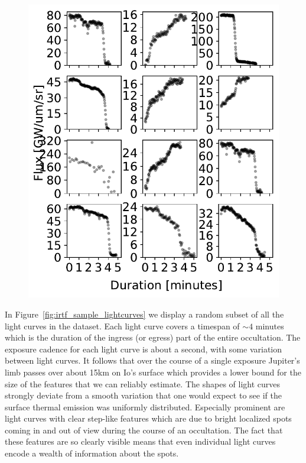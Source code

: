 \documentclass[modern]{aastex62}
\begin{document}
\begin{figure}[h!]
    \begin{centering}
        \includegraphics[width=\linewidth]{figures/irtf_sample_lightcurves.pdf}
    \end{centering}
\end{figure}

In Figure~\ref{fig:irtf_sample_lightcurves} we display a random subset of all the light curves
in the dataset. 
Each light curve covers a timespan of $\sim 4$ minutes which is the duration of the ingress (or egress) part of the entire occultation.
The exposure cadence for each light curve is about a second, with some variation between light curves.
It follows that over the course of a single exposure Jupiter's limb passes over about 15km on Io's surface which provides a lower bound for the size of the features that we can reliably estimate.
The shapes of light curves strongly deviate from a smooth variation that one would expect to see if the surface thermal emission was uniformly distributed.
Especially prominent are light curves with clear step-like features which are due to bright localized spots coming in and out of view during the course of an occultation.
The fact that these features are so clearly visible means that even individual light curves encode a wealth of information about the spots.
\end{document}
